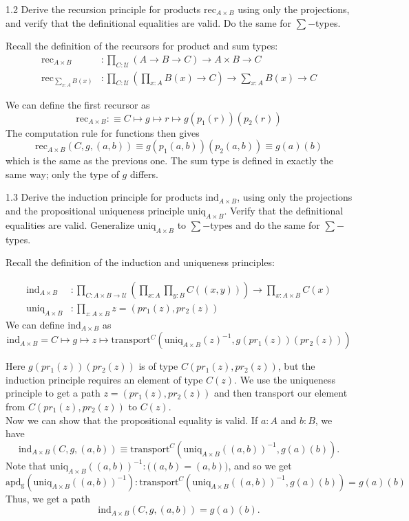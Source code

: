 \documentclass[14pt]{extarticle}
\newcommand{\0}{{\mathbf 0}}
\newcommand{\1}{{\mathbf 1}}
\newcommand{\2}{{\mathbf 2}}
\newcommand{\UU}{{\mathcal U}}
\newcommand{\mt}{\mapsto}
\newcommand{\rec}{\mathrm{rec}}
\newcommand{\ind}{\mathrm{ind}}
\newcommand{\uniq}{\mathrm{uniq}}
\newcommand{\tr}{\mathrm{transport}}
\begin{document}
\begin{prob}{1.2}{}
Derive the recursion principle for products $\rec_{A \times B}$ using only the projections, and verify that the definitional equalities are valid. Do the same for $\sum-$types.
\end{prob}

Recall the definition of the recursors for product and sum types:
\begin{align*}
\rec_{A \times B} &: \prod_{C:\UU} (A \to B \to C) \to  A \times B \to C \\
\rec_{\sum_{x:A}B(x)} &:\prod_{C:\UU} \left(\prod_{x:A}B(x) \to C \right) \to \sum_{x:A}B(x) \to C
\end{align*}

We can define the first recursor as \[\rec_{A \times B} : \equiv C \mt g \mt r \mt g(p_1(r))(p_2(r))\] The computation rule for functions then gives
\[\rec_{A \times B}(C,g,(a,b)) \equiv g(p_1(a,b))(p_2(a,b)) \equiv g(a)(b)\] which is the same as the previous one. The sum type is defined in exactly the same way; only the type of $g$ differs.

\begin{prob}{1.3}{}
Derive the induction principle for products $\ind_{A\times B}$, using only the projections and the propositional uniqueness principle $\uniq_{A\times B}$. Verify that the definitional equalities are valid. Generalize $\uniq_{A\times B}$ to $\sum-$types and do the same for $\sum-$types.
\end{prob}
Recall the definition of the induction and uniqueness principles:

\begin{align*}
\ind_{A \times B} &: \prod_{C : A \times B \to \UU} \left(\prod_{x : A}\prod_{y:B} C((x,y))\right) \to \prod_{x : A \times B} C(x)\\
\mathrm{uniq}_{A\times B} &: \prod_{z : A \times B} z = (pr_1(z) , pr_2(z))
\end{align*}
We can define $\ind_{A \times B}$ as
\[\ind_{A \times B} = C \mt g \mt z \mt \tr^{C}(\mathrm{uniq}_{A\times B}(z)^{-1}, g(pr_1(z))(pr_2(z)))\]

Here $g(pr_1(z))(pr_2(z))$ is of type $C(pr_1(z), pr_2(z))$, but the induction principle requires an element of type $C(z)$. We use the uniqueness principle to get a path $z = (pr_1(z), pr_2(z))$ and then transport our element from $C(pr_1(z), pr_2(z))$ to $C(z)$.\\
Now we can show that the propositional equality is valid. If $a:A$ and $b:B$, we have
\[\ind_{A \times B}(C, g, (a,b)) \equiv \tr^{C}(\mathrm{uniq}_{A\times B}((a,b))^{-1}, g(a)(b)).\] Note that $\mathrm{uniq}_{A\times B}((a,b))^{-1} : \Big((a,b) = (a,b)\Big)$, and so we get
\[\mathrm{apd_g}(\mathrm{uniq}_{A\times B}((a,b))^{-1}) : \tr^{C}(\mathrm{uniq}_{A\times B}((a,b))^{-1}, g(a)(b)) = g(a)(b)\] Thus, we get a path 
\[\ind_{A \times B}(C, g, (a,b)) = g(a)(b).\]
\end{document}
